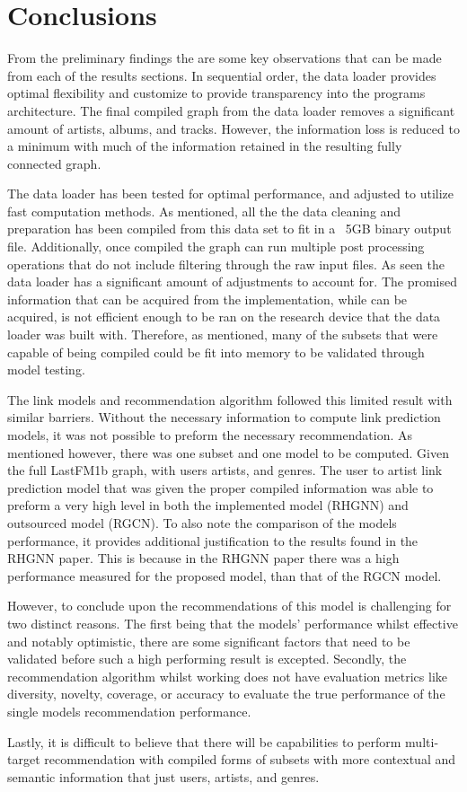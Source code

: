 \chapter{Conclusions}

From the preliminary findings the are some key observations that can be made from each of the results sections. In sequential order, the data loader provides optimal flexibility and customize to provide transparency into the programs architecture. The final compiled graph from the data loader removes a significant amount of artists, albums, and tracks. However, the information loss is reduced to a minimum with much of the information retained in the resulting fully connected graph.

The data loader has been tested for optimal performance, and adjusted to utilize fast computation methods. As mentioned, all the the data cleaning and preparation has been compiled from this data set to fit in a ~5GB binary output file. Additionally, once compiled the graph can run multiple post processing operations that do not include filtering through the raw input files. As seen the data loader has a significant amount of adjustments to account for. The promised information that can be acquired from the implementation, while can be acquired, is not efficient enough to be ran on the research device that the data loader was built with. Therefore, as mentioned, many of the subsets that were capable of being compiled could be fit into memory to be validated through model testing.


The link models and recommendation algorithm followed this limited result with similar barriers. Without the necessary information to compute link prediction models, it was not possible to preform the necessary recommendation. As mentioned however, there was one subset and one model to be computed. Given the full LastFM1b graph, with users artists, and genres. The user to artist link prediction model that was given the proper compiled information was able to preform a very high level in both the implemented model (RHGNN) and outsourced model (RGCN). To also note the comparison of the models performance, it provides additional justification to the results found in the RHGNN paper. This is because in the RHGNN paper there was a high performance measured for the proposed model, than that of the RGCN model.

However, to conclude upon the recommendations of this model is challenging for two distinct reasons. The first being that the models' performance whilst effective and notably optimistic, there are some significant factors that need to be validated before such a high performing result is excepted. Secondly, the recommendation algorithm whilst working does not have evaluation metrics like diversity, novelty, coverage, or accuracy to evaluate the true performance of the single models recommendation performance.

Lastly, it is difficult to believe that there will be capabilities to perform multi-target recommendation with compiled forms of subsets with more contextual and semantic information that just users, artists, and genres.




\newpage